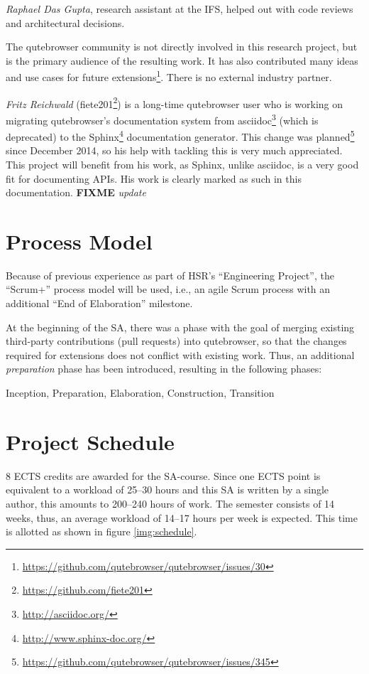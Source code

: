 \documentclass[a4paper,parskip=full]{scrreprt}
\newcommand{\fixme}[1]{\textbf{FIXME} \emph{#1}}
\begin{document}
\emph{Raphael Das Gupta}, research assistant at the IFS, helped out with code
reviews and architectural decisions.

The qutebrowser community is not directly involved in this research project, but
is the primary audience of the resulting work. It has also contributed many
ideas and use cases for future
extensions\footnote{\url{https://github.com/qutebrowser/qutebrowser/issues/30}}.
There is no external industry partner.

\label{fiete}
\emph{Fritz Reichwald} (fiete201\footnote{\url{https://github.com/fiete201}})
is a long-time qutebrowser user who is working on migrating qutebrowser's
documentation system from asciidoc\footnote{\url{http://asciidoc.org/}} (which
is deprecated) to the Sphinx\footnote{\url{http://www.sphinx-doc.org/}}
documentation generator. This change was
planned\footnote{\url{https://github.com/qutebrowser/qutebrowser/issues/345}}
since December 2014, so his help with tackling this is very much appreciated.
This project will benefit from his work, as Sphinx, unlike asciidoc, is a
very good fit for documenting APIs. His work is clearly marked as such in this
documentation. \fixme{update}

\section{Process Model}
Because of previous experience as part of HSR's ``Engineering Project'', the
``Scrum+'' process model will be used, i.e., an agile Scrum process with an
additional ``End of Elaboration'' milestone.

At the beginning of the SA, there was a phase with the goal of merging existing
third-party contributions (pull requests) into qutebrowser, so that the changes
required for extensions does not conflict with existing work. Thus, an additional
\emph{preparation} phase has been introduced, resulting in the following phases:

Inception, Preparation, Elaboration, Construction, Transition

\section{Project Schedule}
\label{schedule}

8 ECTS credits are awarded for the SA-course. Since one ECTS point is equivalent
to a workload of 25--30 hours \autocite{ects} and this SA is written by a single
author, this amounts to 200--240 hours of work. The semester consists of 14
weeks, thus, an average workload of 14--17 hours per week is expected. This time
is allotted as shown in figure \ref{img:schedule}.
\end{document}
